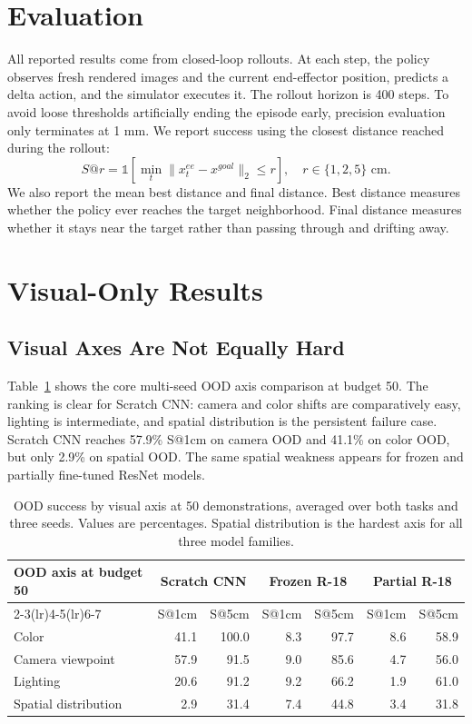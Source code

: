 \documentclass[10pt,twocolumn,letterpaper]{article}
\makeatletter
\newcommand{\sone}{S@1cm}
\newcommand{\sfive}{S@5cm}
\makeatother
\begin{document}
\section{Evaluation}
All reported results come from closed-loop rollouts. At each step, the policy observes fresh rendered images and the current end-effector position, predicts a delta action, and the simulator executes it. The rollout horizon is 400 steps. To avoid loose thresholds artificially ending the episode early, precision evaluation only terminates at 1 mm. We report success using the closest distance reached during the rollout:
\[
S@r = \mathbb{1}\left[\min_t \lVert x^{ee}_t - x^{goal} \rVert_2 \le r \right],
\quad r \in \{1,2,5\}\text{ cm}.
\]
We also report the mean best distance and final distance. Best distance measures whether the policy ever reaches the target neighborhood. Final distance measures whether it stays near the target rather than passing through and drifting away.

\section{Visual-Only Results}
\subsection{Visual Axes Are Not Equally Hard}
Table~\ref{tab:axis50} shows the core multi-seed OOD axis comparison at budget 50. The ranking is clear for Scratch CNN: camera and color shifts are comparatively easy, lighting is intermediate, and spatial distribution is the persistent failure case. Scratch CNN reaches 57.9\% \sone{} on camera OOD and 41.1\% on color OOD, but only 2.9\% on spatial OOD. The same spatial weakness appears for frozen and partially fine-tuned ResNet models.

\begin{table}[t]
\centering
\small
\begin{tabular}{lrrrrrr}
\toprule
OOD axis at budget 50 & \multicolumn{2}{c}{Scratch CNN} & \multicolumn{2}{c}{Frozen R-18} & \multicolumn{2}{c}{Partial R-18} \\
\cmidrule(lr){2-3}\cmidrule(lr){4-5}\cmidrule(lr){6-7}
 & \sone{} & \sfive{} & \sone{} & \sfive{} & \sone{} & \sfive{} \\
\midrule
Color & 41.1 & 100.0 & 8.3 & 97.7 & 8.6 & 58.9 \\
Camera viewpoint & 57.9 & 91.5 & 9.0 & 85.6 & 4.7 & 56.0 \\
Lighting & 20.6 & 91.2 & 9.2 & 66.2 & 1.9 & 61.0 \\
Spatial distribution & 2.9 & 31.4 & 7.4 & 44.8 & 3.4 & 31.8 \\
\bottomrule
\end{tabular}
\caption{OOD success by visual axis at 50 demonstrations, averaged over both tasks and three seeds. Values are percentages. Spatial distribution is the hardest axis for all three model families.}
\label{tab:axis50}
\end{table}
\end{document}
